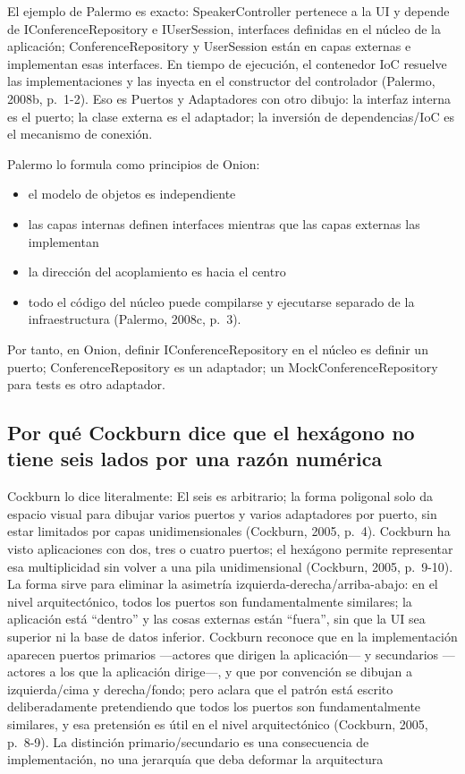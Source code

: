 \documentclass[12pt,a4paper]{article}
\begin{document}
El ejemplo de Palermo es exacto: SpeakerController pertenece a la UI y depende de IConferenceRepository e IUserSession, interfaces definidas en el núcleo de la aplicación; ConferenceRepository y UserSession están en capas externas e implementan esas interfaces. En tiempo de ejecución, el contenedor IoC resuelve las implementaciones y las inyecta en el constructor del controlador (Palermo, 2008b, p.~1-2). Eso es Puertos y Adaptadores con otro dibujo: la interfaz interna es el puerto; la clase externa es el adaptador; la inversión de dependencias/IoC es el mecanismo de conexión.

Palermo lo formula como principios de Onion:

\begin{itemize}[label=$\cdot$]
  \item el modelo de objetos es independiente
  \item las capas internas definen interfaces mientras que las capas externas las implementan
  \item la dirección del acoplamiento es hacia el centro
  \item todo el código del núcleo puede compilarse y ejecutarse separado de la infraestructura (Palermo, 2008c, p.~3).
\end{itemize}

Por tanto, en Onion, definir IConferenceRepository en el núcleo es definir un puerto; ConferenceRepository es un adaptador; un MockConferenceRepository para tests es otro adaptador.

\subsection{Por qué Cockburn dice que el hexágono no tiene seis lados por una razón numérica}

Cockburn lo dice literalmente: El seis es arbitrario; la forma poligonal solo da espacio visual para dibujar varios puertos y varios adaptadores por puerto, sin estar limitados por capas unidimensionales (Cockburn, 2005, p.~4). Cockburn ha visto aplicaciones con dos, tres o cuatro puertos; el hexágono permite representar esa multiplicidad sin volver a una pila unidimensional (Cockburn, 2005, p.~9-10). La forma sirve para eliminar la asimetría izquierda-derecha/arriba-abajo: en el nivel arquitectónico, todos los puertos son fundamentalmente similares; la aplicación está ``dentro'' y las cosas externas están ``fuera'', sin que la UI sea superior ni la base de datos inferior. Cockburn reconoce que en la implementación aparecen puertos primarios ---actores que dirigen la aplicación--- y secundarios ---actores a los que la aplicación dirige---, y que por convención se dibujan a izquierda/cima y derecha/fondo; pero aclara que el patrón está escrito deliberadamente pretendiendo que todos los puertos son fundamentalmente similares, y esa pretensión es útil en el nivel arquitectónico (Cockburn, 2005, p.~8-9). La distinción primario/secundario es una consecuencia de implementación, no una jerarquía que deba deformar la arquitectura
\end{document}
